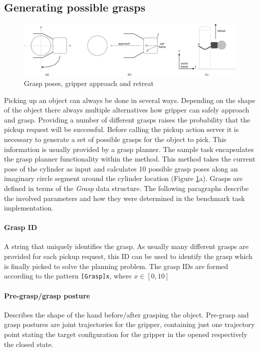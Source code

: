 \subsection{Generating possible grasps}

\begin{figure}[h]
	\centering
  	\includegraphics[width=1.0\textwidth]{images/grasp_a-c.jpg}
	\caption{Grasp poses, gripper approach and retreat}
	\label{fig:grasp_stages}
\end{figure}

Picking up an object can always be done in several ways. Depending on the shape of the object there always multiple alternatives how gripper can safely approach and grasp. Providing a number of different grasps raises the probability that the pickup request will be successful. Before calling the pickup action server it is necessary to generate a set of possible grasps for the object to pick. This information is usually provided by a grasp planner. The sample task encapsulates the grasp planner functionality within the  method. This method takes the current pose of the cylinder as input and calculates 10 possible grasp poses along an imaginary circle segment around the cylinder location (Figure \ref{fig:grasp_stages}a). Grasps are defined in terms of the \emph{Grasp} data structure. The following paragraphs describe the involved parameters and how they were determined in the benchmark task implementation.

\paragraph{Grasp ID} A string that uniquely identifies the grasp. As usually many different grasps are provided for each pickup request, this ID can be used to identify the grasp which is finally picked to solve the planning problem. The grasp IDs are formed according to the pattern \texttt{[Grasp]x}, where $x \in [0,10]$ 

\paragraph{Pre-grasp/grasp posture} Describes the shape of the hand before/after grasping the object.
Pre-grasp and grasp postures are joint trajectories for the gripper, containing just one trajectory point stating the target configuration for the gripper in the opened respectively the closed state.

